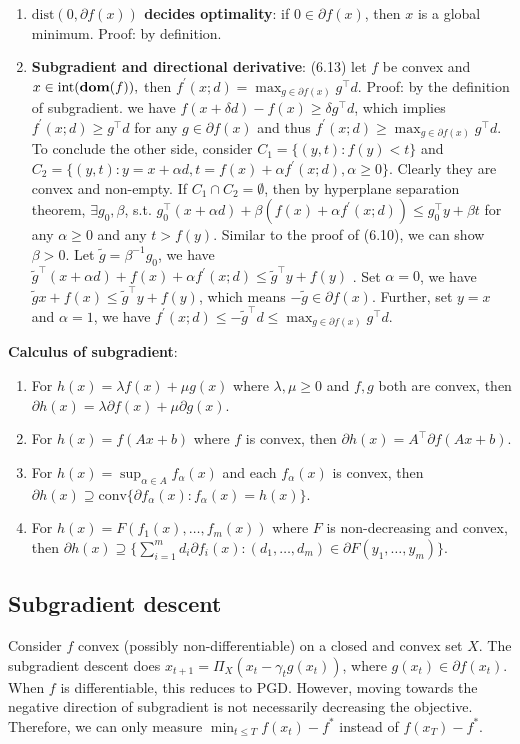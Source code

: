 \begin{enumerate}
    \item \textbf{$\text{dist}(0, \partial f(x))$ decides optimality}: if $0 \in \partial f(x)$, then $x$ is a global minimum. Proof: by definition.
    \item \textbf{Subgradient and directional derivative}: (6.13) let $f$ be convex and $x \in \text{int}(\operatorname{\textbf{dom}}(f)),$ then $f^\prime(x ;d) = \max_{g \in \partial f(x)} g^\top d$. Proof: by the definition of subgradient. we have $f(x+\delta d) - f(x) \ge \delta g^\top d$, which implies $f^\prime(x ; d) \ge g^\top d$ for any $g \in \partial f(x)$ and thus $f^\prime(x ; d) \ge \max_{g \in \partial f(x)} g^\top d$. To conclude the other side, consider $C_1 = \{(y,t): f(y)<t\}$ and $C_2 = \{(y,t): y=x+\alpha d, t = f(x)+\alpha f^\prime(x;d), \alpha \ge 0\}$. Clearly they are convex and non-empty. If $C_1 \cap C_2 = \emptyset$, then by hyperplane separation theorem, $\exists g_0, \beta$, s.t. $g_0^\top (x+\alpha d) + \beta (f(x) + \alpha f^\prime(x;d)) \le g_0^\top y + \beta t$ for any $\alpha \ge 0$ and any $t > f(y)$. Similar to the proof of (6.10), we can show $\beta > 0$. Let $\tilde{g}=\beta^{-1} g_0$, we have $\tilde{g}^\top (x+\alpha d) + f(x) + \alpha f^\prime(x;d) \le \tilde{g}^\top y + f(y)$ . Set $\alpha = 0$, we have $\tilde{g}x + f(x) \le \tilde{g}^\top y + f(y)$, which means $-\tilde{g} \in \partial f(x)$. Further, set $y=x$ and $\alpha=1$, we have $f^\prime(x;d) \le - \tilde{g}^\top d \le \max_{g \in \partial f(x)} g^\top d$.
\end{enumerate}

\textbf{Calculus of subgradient}:
\begin{enumerate}
    \item For $h(x) = \lambda f(x) + \mu g(x)$ where $\lambda, \mu \ge 0$ and $f,g$ both are convex, then $\partial h(x) = \lambda \partial f(x) + \mu \partial g(x)$.
    \item For $h(x) = f(Ax+b)$ where $f$ is convex, then $\partial h(x) = A^\top \partial f(Ax+b)$.
    \item For $h(x) = \sup_{\alpha \in A} f_\alpha(x)$ and each $f_\alpha(x)$ is convex, then $\partial h(x) \supseteq \text{conv}\{\partial f_\alpha(x): f_\alpha(x) = h(x)\}$.
    \item For $h(x) = F(f_1(x), \dots, f_m(x))$ where $F$ is non-decreasing and convex, then $\partial h(x) \supseteq \{\sum_{i=1}^m d_i \partial f_i(x): (d_1, \dots, d_m) \in \partial F(y_1, \dots, y_m)\}$.
\end{enumerate}

\subsection{Subgradient descent} 
Consider $f$ convex (possibly non-differentiable) on a closed and convex set $X$. The subgradient descent does $x_{t+1} = \Pi_X(x_t - \gamma_t g(x_t))$, where $g(x_t) \in \partial f(x_t)$. When $f$ is differentiable, this reduces to PGD. However, moving towards the negative direction of subgradient is not necessarily decreasing the objective. Therefore, we can only measure $\min_{t \le T} f(x_t) - f^*$ instead of $f(x_T)-f^*$.

